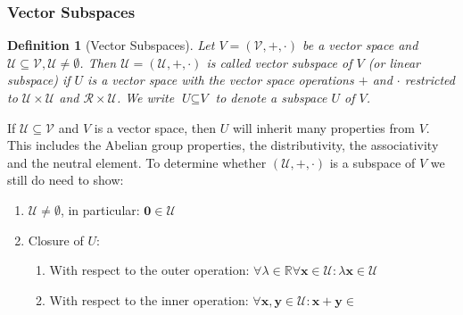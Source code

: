 \documentclass{article}
\newtheorem{definition}{Definition}[section]
\begin{document}
	\subsubsection{Vector Subspaces}
	\begin{definition}[Vector Subspaces]
		\normalfont Let $\textit{V} = (\mathcal{V}, +, \cdot)$ be a vector space and $\mathcal{U} \subseteq \mathcal{V}, \mathcal{U} \ne \emptyset$. Then $\mathcal{U} = (\mathcal{U}, +, \cdot)$ is called vector subspace of $\textit{V}$ (or linear subspace) if $\mathit{U}$ is a vector space with the vector space operations $+$ and $\cdot$ restricted to $\mathcal{U} \times  \mathcal{U}$ and $\mathcal{R} \times \mathcal{U}$. We write $\textit{U} \subseteq \textit{V}$ to denote a subspace $\textit{U}$ of $\textit{V}$.
	\end{definition}
	If $\mathcal{U} \subseteq \mathcal{V}$ and $\textit{V}$ is a vector space, then $\textit{U}$ will inherit many properties from $\textit{V}$. This includes the Abelian group properties, the distributivity, the associativity and the neutral element. To determine whether $(\mathcal{U}, +, \cdot)$ is a subspace of $\textit{V}$ we still do need to show:
	\begin{enumerate}
		\item $\mathcal{U} \ne \emptyset$, in particular: $\textbf{0} \in \mathcal{U}$
		\item Closure of $\textit{U}$:
		\begin{enumerate}
			\item With respect to the outer operation: $\forall \lambda \in \mathbb{R} \forall \textbf{x} \in \mathcal{U}: \lambda\textbf{x} \in \mathcal{U}$
			\item With respect to the inner operation: $\forall \textbf{x}, \textbf{y} \in \mathcal{U}: \textbf{x} + \textbf{y} \in \ $
		\end{enumerate}
	\end{enumerate}
\end{document}
